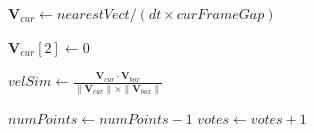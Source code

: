 \documentclass[14pt,a4paper]{article}
\begin{document}
\begin{algorithm}
\begin{algorithmic}[1]
        \State $\mathbf{V}_{cur} \gets nearestVect / (dt \times curFrameGap)$
        
            \State $\mathbf{V}_{cur}[2] \gets 0$
        \EndIf
        
        \State $velSim \gets \frac{\mathbf{V}_{cur} \cdot \mathbf{V}_{box}}{\|\mathbf{V}_{cur}\| \times \|\mathbf{V}_{box}\|}$
        
            \State $numPoints \gets numPoints - 1$
        \Else
                \State $votes \gets votes + 1$
            \EndIf
        \EndIf
    \EndFor
    
\end{algorithmic}
\end{algorithm}
\end{document}
